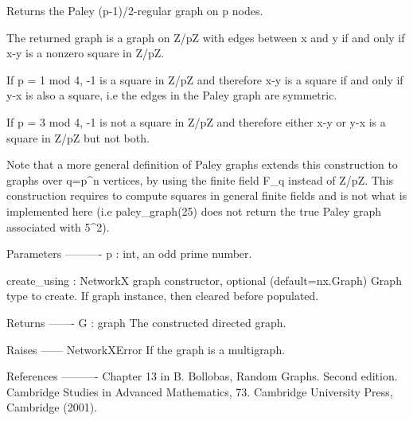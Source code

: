 \begin{DoxyVerb}Returns the Paley (p-1)/2-regular graph on p nodes.

The returned graph is a graph on Z/pZ with edges between x and y
if and only if x-y is a nonzero square in Z/pZ.

If p = 1 mod 4, -1 is a square in Z/pZ and therefore x-y is a square if and
only if y-x is also a square, i.e the edges in the Paley graph are symmetric.

If p = 3 mod 4, -1 is not a square in Z/pZ and therefore either x-y or y-x
is a square in Z/pZ but not both.

Note that a more general definition of Paley graphs extends this construction
to graphs over q=p^n vertices, by using the finite field F_q instead of Z/pZ.
This construction requires to compute squares in general finite fields and is
not what is implemented here (i.e paley_graph(25) does not return the true
Paley graph associated with 5^2).

Parameters
----------
p : int, an odd prime number.

create_using : NetworkX graph constructor, optional (default=nx.Graph)
   Graph type to create. If graph instance, then cleared before populated.

Returns
-------
G : graph
    The constructed directed graph.

Raises
------
NetworkXError
    If the graph is a multigraph.

References
----------
Chapter 13 in B. Bollobas, Random Graphs. Second edition.
Cambridge Studies in Advanced Mathematics, 73.
Cambridge University Press, Cambridge (2001).
\end{DoxyVerb}
 